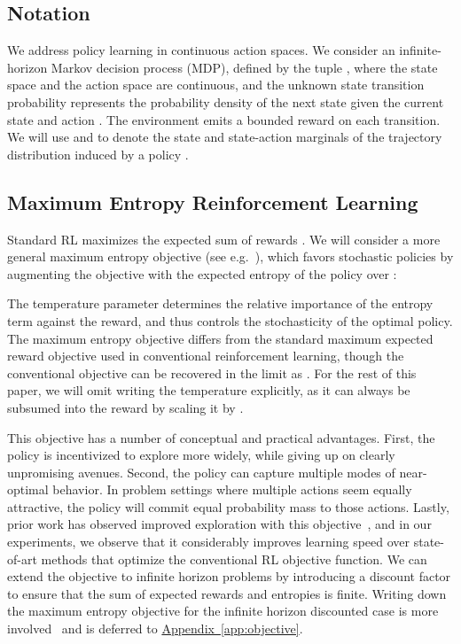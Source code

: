 \documentclass{article}
\newcommand{\eg}{e.g.\ }
\newcommand{\aref}[1]{\hyperref[#1]{Appendix~\ref*{#1}}}
\begin{document}
\vspace{-1mm}
\subsection{Notation}

We address policy learning in continuous action spaces. We consider an infinite-horizon Markov decision process (MDP), defined by the tuple , where the state space  and the action space  are continuous, and the unknown state transition probability  represents the probability density of the next state  given the current state  and action . The environment emits a bounded reward  on each transition. We will use  and  to denote the state and state-action marginals of the trajectory distribution induced by a policy . 

\subsection{Maximum Entropy Reinforcement Learning}


Standard RL maximizes the expected sum of rewards . We will consider a more general maximum entropy objective (see \eg \citet{ziebart2010modeling}), which favors stochastic policies by augmenting the objective with the expected entropy of the policy over :

The temperature parameter  determines the relative importance of the entropy term against the reward, and thus controls the stochasticity of the optimal policy. The maximum entropy objective differs from the standard maximum expected reward objective used in conventional reinforcement learning, though the conventional objective can be recovered in the limit as . For the rest of this paper, we will omit writing the temperature explicitly, as it can always be subsumed into the reward by scaling it by . 

This objective has a number of conceptual and practical advantages. First, the policy is incentivized to explore more widely, while giving up on clearly unpromising avenues. Second, the policy can capture multiple modes of near-optimal behavior. In problem settings where multiple actions seem equally attractive, the policy will commit equal probability mass to those actions.
Lastly, prior work has observed improved exploration with this objective~\citep{haarnoja2017reinforcement,schulman2017equivalence}, and in our experiments, we observe that it considerably improves learning speed over state-of-art methods that optimize the conventional RL objective function. We can extend the objective to infinite horizon problems by introducing a discount factor  to ensure that the sum of expected rewards and entropies is finite. Writing down the maximum entropy objective for the infinite horizon discounted case is more involved~\citep{thomas2014bias} and is deferred to \aref{app:objective}.
\end{document}
